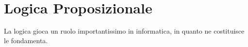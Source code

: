 \chapter{Logica Proposizionale}
La logica gioca un ruolo importantissimo in informatica, in quanto ne costituisce le fondamenta. 

